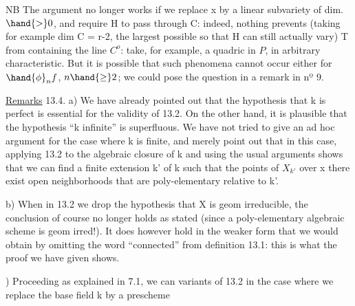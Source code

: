 
NB \quad The argument no longer works if we replace x by a
linear subvariety  of dim.$\hand{>}0$, and require H to pass
through C: indeed, nothing prevents (taking for example dim C = r-2, the
largest possible so that H can still actually vary)
T from containing the line $C^{o}$:
 take, for
example, a  quadric in $P$, in arbitrary characteristic. But it
is possible that such phenomena cannot occur either 
for $\hand{\phi}_n f$, $n\hand{\geq} 2$; we could pose the question in a remark in
nº 9.

\uline{Remarks} 13.4. \quad a) We have already pointed out that the hypothesis that k 
is perfect is essential for the validity of 13.2. On the other hand, it
is plausible that the hypothesis “k infinite” is superfluous. 
We have not tried  to give an ad hoc argument for the case
where k is finite, and merely point out that in this case, applying
13.2 to the algebraic closure of k and using the usual arguments
shows that we can find a finite extension k' of k such that
  the points of $X_{k'}$ over x there exist open neighborhoods
that are poly-elementary relative to k'.

b) When in 13.2 we drop the hypothesis that X is geom
irreducible, the conclusion of course no longer holds as stated
(since a poly-elementary algebraic scheme is geom irred!). It
does however hold in the weaker form that we would obtain by
omitting the word “connected” from definition 13.1: this is what
the proof we have given shows.

) Proceeding as explained in 7.1, we can  variants
of 13.2 in the case where we replace the base field k by a prescheme
